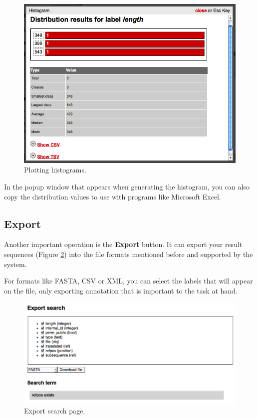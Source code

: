 \begin{figure}[ht]
  \centering
    \includegraphics[scale=0.4]{histogram.png}
  \caption{Plotting histograms.}
  \label{fig:histogram_man}
\end{figure}

In the popup window that appears when generating the histogram, you can also copy the distribution values
to use with programs like Microsoft Excel.

\subsection{Export}

Another important operation is the \textbf{Export} button.
It can export your result sequences (Figure \ref{fig:export_search})
into the file formats mentioned before and supported by the system.

For formats like FASTA, CSV or XML, you can select the labels that will appear on the file, only exporting annotation 
that is important to the task at hand.

\begin{figure}[ht]
  \centering
    \includegraphics[scale=0.4]{export_search.png}
  \caption{Export search page.}
  \label{fig:export_search}
\end{figure}

